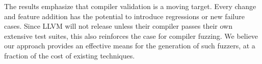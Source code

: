 \begin{table}
  \footnotesize %
  \centering %
  
  \caption{%
    The number of DeepSmith programs which trigger distinct Clang front-end assertions, and the number of programs which trigger unreachables.%
  }
  \label{tab:clangs}
\end{table}

The results emphasize that compiler validation is a moving target. Every change and feature addition has the potential to introduce regressions or new failure cases. Since LLVM will not release unless their compiler passes their own extensive test suites, this also reinforces the case for compiler fuzzing. We believe our approach provides an effective means for the generation of such fuzzers, at a fraction of the cost of existing techniques.
